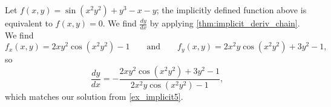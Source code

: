 {Let $f(x,y) = \sin(x^2y^2)+y^3-x-y$; the implicitly defined function above is equivalent to $f(x,y)=0$. We find $\frac{dy}{dx}$ by applying \autoref{thm:implicit_deriv_chain}. We find 
\[f_x(x,y) = 2xy^2\cos(x^2y^2)-1\qquad \text{and}\qquad f_y(x,y) = 2x^2y\cos(x^2y^2)+3y^2-1,\]
so 
\[\frac{dy}{dx} = -\frac{2xy^2\cos(x^2y^2)+3y^2-1}{2x^2y\cos(x^2y^2)-1},\]
which matches our solution from \autoref{ex_implicit5}.}


